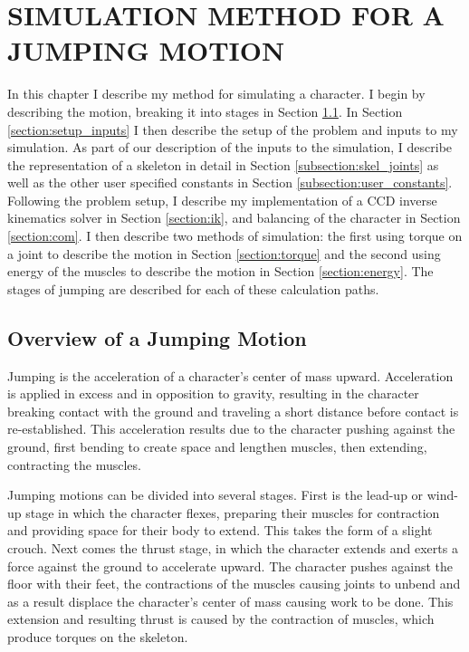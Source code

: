  
\chapter{SIMULATION METHOD FOR A JUMPING MOTION}
\label{chapter:animation}
In this chapter I describe my method for simulating a character.  I begin by describing the motion, breaking it into stages in Section \ref{section:motion_desc}.  In Section \ref{section:setup_inputs} I then describe the setup of the problem and inputs to my simulation.  As part of our description of the inputs to the simulation, I describe the representation of a skeleton in detail in Section \ref{subsection:skel_joints} as well as the other user specified constants in Section \ref{subsection:user_constants}.  Following the problem setup, I describe my implementation of a CCD inverse kinematics solver in Section \ref{section:ik}, and balancing of the character in Section \ref{section:com}.  I then describe two methods of simulation: the first using torque on a joint to describe the motion in Section \ref{section:torque} and the second using energy of the muscles to describe the motion in Section \ref{section:energy}.  The stages of jumping are described for each of these calculation paths.

\section{Overview of a Jumping Motion}
\label{section:motion_desc}
Jumping is the acceleration of a character's center of mass upward.  Acceleration is applied in excess and in opposition to gravity, resulting in the character breaking contact with the ground and traveling a short distance before contact is re-established.  This acceleration results due to the character pushing against the ground, first bending to create space and lengthen muscles, then extending, contracting the muscles.

Jumping motions can be divided into several stages.  First is the lead-up or wind-up stage in which the character flexes, preparing their muscles for contraction and providing space for their body to extend.  This takes the form of a slight crouch.  Next comes the thrust stage, in which the character extends and exerts a force against the ground to accelerate upward.  The character pushes against the floor with their feet, the contractions of the muscles causing joints to unbend and as a result displace the character's center of mass causing work to be done.  This extension and resulting thrust is caused by the contraction of muscles, which produce torques on the skeleton.

